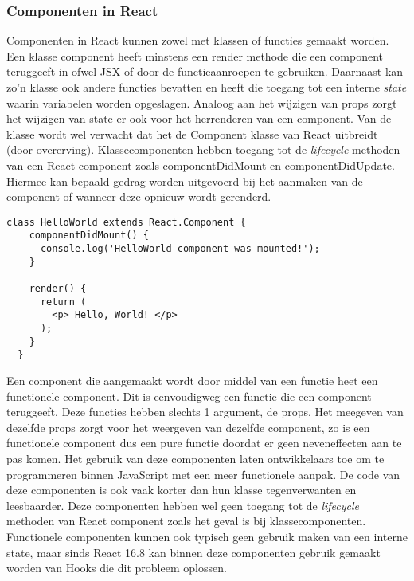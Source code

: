 \subsubsection{Componenten in React}
Componenten in React kunnen zowel met klassen of functies gemaakt worden. Een klasse component heeft minstens een render methode die een component teruggeeft in ofwel JSX of door de functieaanroepen te gebruiken.  Daarnaast kan zo'n klasse ook andere functies bevatten en heeft die toegang tot een interne \textit{state} waarin variabelen worden opgeslagen. Analoog aan het wijzigen van props zorgt het wijzigen van state er ook voor het herrenderen van een component. Van de klasse wordt wel verwacht dat het de Component klasse van React uitbreidt (door overerving). Klassecomponenten hebben toegang tot de \textit{lifecycle} methoden van een React component zoals componentDidMount en componentDidUpdate. Hiermee kan bepaald gedrag worden uitgevoerd bij het aanmaken van de component of wanneer deze opnieuw wordt gerenderd.

\begin{lstlisting}[caption=Klassecomponent]
  class HelloWorld extends React.Component {
    componentDidMount() {
      console.log('HelloWorld component was mounted!');
    }

    render() {
      return (
        <p> Hello, World! </p>
      );
    }
  }
\end{lstlisting}

Een component die aangemaakt wordt door middel van een functie heet een functionele component. Dit is eenvoudigweg een functie die een component teruggeeft. Deze functies hebben slechts 1 argument, de props. Het meegeven van dezelfde props zorgt voor het weergeven van dezelfde component, zo is een functionele component dus een pure functie doordat er geen neveneffecten aan te pas komen. Het gebruik van deze componenten laten ontwikkelaars toe om te programmeren binnen JavaScript met een meer functionele aanpak. De code van deze componenten is ook vaak korter dan hun klasse tegenverwanten en leesbaarder. Deze componenten hebben wel geen toegang tot de \textit{lifecycle} methoden van React component zoals het geval is bij klassecomponenten. Functionele componenten kunnen ook typisch geen gebruik maken van een interne state, maar sinds React 16.8 kan binnen deze componenten gebruik gemaakt worden van Hooks die dit probleem oplossen. 

